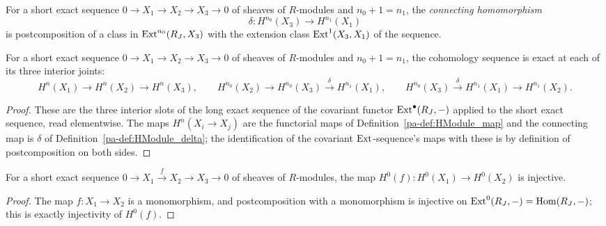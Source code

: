 \begin{definition}
  \label{pa-def:HModule_delta}
  \leanok

  For a short exact sequence \(0 \to X_1 \to X_2 \to X_3 \to 0\) of sheaves of \(R\)-modules and
  \(n_0 + 1 = n_1\), the \emph{connecting homomorphism}
  \[
    \delta : H^{n_0}(X_3) \longrightarrow H^{n_1}(X_1)
  \]
  is postcomposition of a class in \(\operatorname{Ext}^{n_0}(R_J, X_3)\) with the extension class
  \(\operatorname{Ext}^1(X_3, X_1)\) of the sequence.
\end{definition}

\begin{theorem}
  \label{pa-thm:HModule_slice_exact}
  \leanok

  For a short exact sequence \(0 \to X_1 \to X_2 \to X_3 \to 0\) of sheaves of \(R\)-modules and
  \(n_0 + 1 = n_1\), the cohomology sequence is exact at each of its three interior joints:
  \[
    H^{n}(X_1) \to H^{n}(X_2) \to H^{n}(X_3), \qquad
    H^{n_0}(X_2) \to H^{n_0}(X_3) \xrightarrow{\delta} H^{n_1}(X_1), \qquad
    H^{n_0}(X_3) \xrightarrow{\delta} H^{n_1}(X_1) \to H^{n_1}(X_2).
  \]
\end{theorem}
\begin{proof}
  \leanok
  These are the three interior slots of the long exact sequence of the covariant functor
  \(\operatorname{Ext}^\bullet(R_J, -)\) applied to the short exact sequence, read elementwise. The maps
  \(H^n(X_i \to X_j)\) are the functorial maps of Definition~\ref{pa-def:HModule_map} and the
  connecting map is \(\delta\) of Definition~\ref{pa-def:HModule_delta}; the identification of the
  covariant \(\operatorname{Ext}\)-sequence's maps with these is by definition of postcomposition on both
  sides.
\end{proof}

\begin{theorem}
  \label{pa-thm:HModule_injective_map_f_zero}
  \leanok

  For a short exact sequence \(0 \to X_1 \xrightarrow{f} X_2 \to X_3 \to 0\) of sheaves of
  \(R\)-modules, the map \(H^0(f) : H^0(X_1) \to H^0(X_2)\) is injective.
\end{theorem}
\begin{proof}
  \leanok
  The map \(f : X_1 \to X_2\) is a monomorphism, and postcomposition with a monomorphism is
  injective on \(\operatorname{Ext}^0(R_J, -) = \operatorname{Hom}(R_J, -)\); this is exactly injectivity of \(H^0(f)\).
\end{proof}

